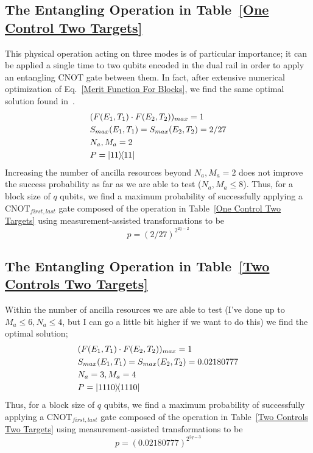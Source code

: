 \documentclass[aps,pra,twocolumn,showpacs,superscriptaddress,floatfix,10pt]{revtex4}
\begin{document}
\subsection{The Entangling Operation in Table~\ref{One Control Two Targets}}
This physical operation acting on three modes is of particular importance; it can be applied a single time to two qubits encoded in the dual rail in order to apply an entangling $\mbox{CNOT}$ gate between them. In fact, after extensive numerical optimization of Eq.~\ref{Merit Function For Blocks}, we find the same optimal solution found in~\cite{Uskov}.
\begin{eqnarray}
& (F(E_1,T_1) \cdot F(E_2,T_2))_{max} = 1 \nonumber \\
& S_{max}(E_1,T_1) = S_{max}(E_2,T_2) = 2/27 \\
& N_a,M_a=2 \nonumber \\
& P = \outerproduct{11}{11} \nonumber	
\end{eqnarray}
Increasing the number of ancilla resources beyond $N_a,M_a=2$ does not improve the success probability as far as we are able to test ($N_a,M_a \le 8$). Thus, for a block size of $q$ qubits, we find a maximum probability of successfully applying a $\mbox{CNOT}_{first,last}$ gate composed of the operation in Table~\ref{One Control Two Targets} using measurement-assisted transformations to be
\begin{equation}
\label{1C2T Result}
p = (2/27)^{2^{2q-2}}
\end{equation}
\subsection{The Entangling Operation in Table~\ref{Two Controls Two Targets}}
Within the number of ancilla resources we are able to test (I've done up to $M_a \le 6,N_a \le 4$, but I can go a little bit higher if we want to do this) we find the optimal solution;
\begin{eqnarray}
&(F(E_1,T_1) \cdot F(E_2,T_2))_{max} = 1 \nonumber \\
&S_{max}(E_1,T_1) = S_{max}(E_2,T_2) = 0.02180777 \\
&N_a = 3,M_a=4 \nonumber \\
&P = \outerproduct{1110}{1110} \nonumber	
\end{eqnarray}
Thus, for a block size of $q$ qubits, we find a maximum probability of successfully applying a $\mbox{CNOT}_{first,last}$ gate composed of the operation in Table~\ref{Two Controls Two Targets} using measurement-assisted transformations to be
\begin{equation}
\label{2C2T Result}
p = (0.02180777)^{2^{2q-3}}
\end{equation}
\end{document}
